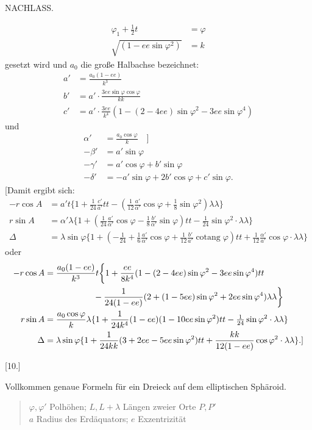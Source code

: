 \clearpage
{}\hfill NACHLASS.\hfill\mbox{}\par
\[
\begin{aligned}
\varphi_1+\tfrac12t&=\varphi\\
\sqrt{(1-ee\sin\varphi^2)}&=k
\end{aligned}
\]
gesetzt wird und $a_0$ die große Halbachse bezeichnet:
\[
\begin{aligned}
a'&=\frac{a_0(1-ee)}{k^3}\\
b'&=a'\cdot\frac{3ee\sin\varphi\cos\varphi}{kk}\\
c'&=a'\cdot\frac{3ee}{k^4}(1-(2-4ee)\sin\varphi^2-3ee\sin\varphi^4)
\end{aligned}
\]
und
\[
\begin{aligned}
\alpha'&=\frac{a_0\cos\varphi}{k}\quad\bigg]\\
-\beta'&=a'\sin\varphi\\
-\gamma'&=a'\cos\varphi+b'\sin\varphi\\
-\delta'&=-a'\sin\varphi+2b'\cos\varphi+c'\sin\varphi.
\end{aligned}
\]
[Damit ergibt sich:
\[
\begin{aligned}
-r\cos A&=a't\{1+\tfrac1{24}\tfrac{c'}{a'}tt-(\tfrac1{12}\tfrac{a'}{\alpha'}\cos\varphi+\tfrac18\sin\varphi^2)\lambda\lambda\}\\
r\sin A&=\alpha'\lambda\{1+(\tfrac1{24}\tfrac{a'}{\alpha'}\cos\varphi-\tfrac18\tfrac{b'}{\alpha'}\sin\varphi)tt-\tfrac1{24}\sin\varphi^2\cdot\lambda\lambda\}\\
\Delta&=\lambda\sin\varphi\{1+(-\tfrac1{24}+\tfrac16\tfrac{a'}{\alpha'}\cos\varphi+\tfrac1{12}\tfrac{b'}{a'}\operatorname{cotang}\varphi)tt+\tfrac1{12}\tfrac{\alpha'}{a'}\cos\varphi\cdot\lambda\lambda\}
\end{aligned}
\]
oder
\[
\begin{aligned}
-r\cos A&=\frac{a_0(1-ee)}{k^3}t\bigg\{1+\frac{ee}{8k^4}(1-(2-4ee)\sin\varphi^2-3ee\sin\varphi^4)tt\\
&\hspace{20mm}-\frac{1}{24(1-ee)}(2+(1-5ee)\sin\varphi^2+2ee\sin\varphi^4)\lambda\lambda\bigg\}\\
r\sin A&=\frac{a_0\cos\varphi}{k}\lambda\{1+\frac{1}{24k^4}(1-ee)(1-10ee\sin\varphi^2)tt-\tfrac1{24}\sin\varphi^2\cdot\lambda\lambda\}\\
\Delta&=\lambda\sin\varphi\{1+\frac{1}{24kk}(3+2ee-5ee\sin\varphi^2)tt+\frac{kk}{12(1-ee)}\cos\varphi^2\cdot\lambda\lambda\}.]
\end{aligned}
\]
\begin{center}[10.]\end{center}
Vollkommen genaue Formeln für ein Dreieck auf dem elliptischen Sphäroid.
\begin{quote}
$\varphi,\varphi'$ Polhöhen; $L,L+\lambda$ Längen zweier Orte $P,P'$\\
$a$ Radius des Erdäquators; $e$ Exzentrizität
\end{quote}

